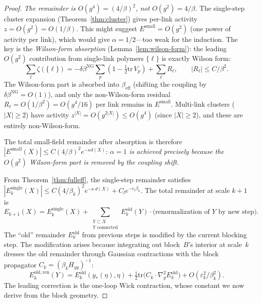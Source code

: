 \documentclass[11pt]{article}
\theoremstyle{definition}
\newcommand{\tr}{\mathrm{tr}}
\begin{document}
\begin{proof}
\emph{The remainder is $O(g^4)=(4/\beta)^2$, not $O(g^2)=4/\beta$.}
The single-step cluster expansion (Theorem~\ref{thm:cluster}) gives
per-link activity $z=O(g^2)=O(1/\beta)$.  This might suggest
$E^{\mathrm{small}}=O(g^2)$ (one power of activity per link), which
would give $\alpha=1/2$---too weak for the induction.
The key is the \emph{Wilson-form absorption}
(Lemma~\ref{lem:wilson-form}): the leading $O(g^2)$ contribution
from single-link polymers $\{\ell\}$ is exactly Wilson form:
\begin{equation}
\sum_\ell\zeta(\{\ell\})
=-\delta\beta^{\mathrm{NG}}\sum_p(1-\tfrac{1}{2}\tr\,V_p)+
\sum_\ell R_\ell,
\qquad|R_\ell|\le C/\beta^2.
\end{equation}
The Wilson-form part is absorbed into $\beta_{\mathrm{eff}}$
(shifting the coupling by $\delta\beta^{\mathrm{NG}}=O(1)$), and only
the non-Wilson-form residual $R_\ell=O(1/\beta^2)=O(g^4/16)$ per link
remains in $E^{\mathrm{small}}$.  Multi-link clusters
($|X|\ge 2$) have activity $z^{|X|}=O(g^{2|X|})\le O(g^4)$ (since
$|X|\ge 2$), and these are entirely non-Wilson-form.

The total small-field remainder after absorption is therefore
$|E^{\mathrm{small}}(X)|\le C(4/\beta)^2 e^{-\kappa d(X)}$:
\emph{$\alpha=1$ is achieved precisely because the $O(g^2)$
Wilson-form part is removed by the coupling shift}.

From Theorem~\ref{thm:fulleff}, the single-step remainder satisfies
$|E_k^{\mathrm{single}}(X)|\le C(4/\beta_k)^2 e^{-\kappa\,d(X)}
+C_l e^{-c_l\beta_k}$.
The total remainder at scale $k+1$ is
\begin{equation}
E_{k+1}(X)=E_k^{\mathrm{single}}(X)
+\sum_{\substack{Y\subset X\\Y\text{ connected}}}
E_k^{\mathrm{old}}(Y)\cdot\text{(renormalization of $Y$ by new step)}.
\end{equation}
The ``old'' remainder $E_k^{\mathrm{old}}$ from previous steps is
modified by the current blocking step.  The modification arises
because integrating out block~$B$'s interior at scale~$k$ dresses
the old remainder through Gaussian contractions with the block
propagator $C_k=(\beta_k H_{yy})^{-1}$:
\begin{equation}\label{eq:remainder-dress}
E_k^{\mathrm{old,ren}}(Y)
=E_k^{\mathrm{old}}(y_*(\eta),\eta)
+\tfrac{1}{2}\mathrm{tr}\bigl(C_k\cdot\nabla_y^2 E_k^{\mathrm{old}}\bigr)
+O(\varepsilon_k^2/\beta_k^2).
\end{equation}
The leading correction is the one-loop Wick contraction,
whose constant we now derive from the block geometry.


\end{proof}
\end{document}

